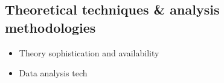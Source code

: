 \subsection{Theoretical techniques \& analysis methodologies}

\begin{itemize}
\item Theory sophistication and availability
\item Data analysis tech
\end{itemize}